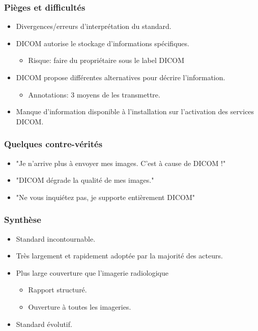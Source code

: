 \frame
{
	\frametitle{Pi\`eges et difficult\'es}
	\begin{itemize}
		\item Divergences/erreurs d'interpr\'etation du standard.
		\item<2-> DICOM autorise le stockage d'informations sp\'ecifiques.
		\begin{itemize}
			\item<3-> Risque: faire du propri\'etaire sous le label DICOM
		\end{itemize}
		\item<4-> DICOM propose diff\'erentes alternatives pour d\'ecrire l'information.
		\begin{itemize}
			\item<5-> Annotations: 3 moyens de les transmettre.
		\end{itemize}
		\item<6-> Manque d'information disponible \`a l'installation sur l'activation des services DICOM.
	\end{itemize}
}

\frame
{
	\frametitle{Quelques contre-v\'erit\'es}
	\begin{itemize}
		\item "Je n'arrive plus \`a envoyer mes images. C'est \`a cause de DICOM !"
		\item<3-> "DICOM d\'egrade la qualit\'e de mes images."
		\item<5-> "Ne vous inqui\'etez pas, je supporte enti\`erement DICOM"
	\end{itemize}
}

\frame
{
	\frametitle{Synth\`ese}
	\begin{itemize}
		\item<1-> Standard incontournable.
		\item<2-> Tr\`es largement et rapidement adopt\'ee par la majorit\'e des acteurs.
		\item<3-> Plus large couverture que l'imagerie radiologique
		\begin{itemize}
			\item<4-> Rapport structur\'e.
			\item<5-> Ouverture \`a toutes les imageries.
		\end{itemize}
		\item<6-> Standard \'evolutif.
	\end{itemize}
}

